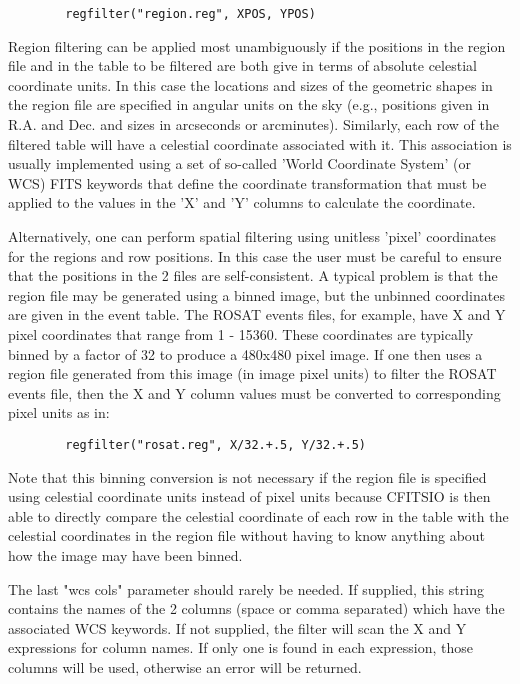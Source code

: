 \documentclass[11pt]{article}
\begin{document}
\begin{verbatim}
        regfilter("region.reg", XPOS, YPOS)
\end{verbatim}
    Region filtering can be applied most unambiguously if the positions
    in the region file and in the table to be filtered are both give in
    terms of absolute celestial coordinate units.  In this case the
    locations and sizes of the geometric shapes in the region file are
    specified in angular units on the sky (e.g., positions given in
    R.A. and Dec.  and sizes in arcseconds or arcminutes).  Similarly,
    each row of the filtered table will have a celestial coordinate
    associated with it.  This association is usually implemented using
    a set of so-called 'World Coordinate System' (or WCS) FITS keywords
    that define the coordinate transformation that must be applied to
    the values in the 'X' and 'Y' columns to calculate the coordinate.

    Alternatively, one can perform spatial filtering using unitless
    'pixel' coordinates for the regions and row positions.  In this
    case the user must be careful to ensure that the positions in the 2
    files are self-consistent.  A typical problem is that the region
    file may be generated using a binned image, but the unbinned
    coordinates are given in the event table.  The ROSAT events files,
    for example, have X and Y pixel coordinates that range from 1 -
    15360.  These coordinates are typically binned by a factor of 32 to
    produce a 480x480 pixel image.  If one then uses a region file
    generated from this image (in image pixel units) to filter the
    ROSAT events file, then the X and Y column values must be converted
    to corresponding pixel units as in:
 
\begin{verbatim}
        regfilter("rosat.reg", X/32.+.5, Y/32.+.5)
\end{verbatim}
    Note that this binning conversion is not necessary if the region
    file is specified using celestial coordinate units instead of pixel
    units because CFITSIO is then able to directly compare the
    celestial coordinate of each row in the table with the celestial
    coordinates in the region file without having to know anything
    about how the image may have been binned.

    The last "wcs cols" parameter should rarely be needed. If supplied,
    this  string contains the names of the 2 columns (space or comma
    separated) which have the associated WCS keywords. If not supplied,
    the filter  will scan the X  and Y expressions for column names.
    If only one is found in each  expression, those columns will be
    used, otherwise an error will be returned.
\end{document}
